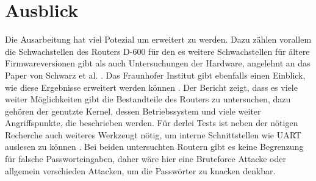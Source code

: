 	\section{Ausblick}
	Die Ausarbeitung hat viel Potezial um erweitert zu werden. Dazu zählen vorallem 
	die Schwachstellen des Routers D-600 für den es weitere Schwachstellen für ältere
	Firmwareversionen gibt als auch Untersuchungen der Hardware, angelehnt an das Paper 
	von Schwarz et al. \cite{schwarz2021}.
	Das Fraunhofer Institut gibt ebenfalls einen Einblick, wie diese Ergebnisse
	erweitert werden können \cite{vomdorp2022}. Der Bericht zeigt, dass es viele
	weiter Möglichkeiten gibt die Bestandteile des Routers zu untersuchen, dazu 
	gehören der genutzte Kernel, dessen Betriebssystem und viele weiter Angriffspunkte,
	die beschrieben werden. Für derlei Tests ist neben der nötigen Recherche auch 
	weiteres Werkzeugt nötig, um interne Schnittstellen wie UART auslesen zu können
	\cite{schwarz2021, vomdorp2022}. 
	Bei beiden untersuchten Routern gibt es keine Begrenzung für falsche Passworteingaben,
	daher wäre hier eine Bruteforce Attacke oder allgemein verschieden Attacken, um die 
	Passwörter zu knacken denkbar.

	\newpage
	


